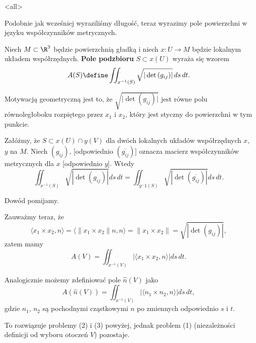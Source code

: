 \mode<all>{}
\begin{frame}

Podobnie jak wcześniej wyraziliśmy długość, teraz wyrazimy pole powierzchni w języku współczynników metrycznych.

\pause
\begin{definicja}\label{def:area-form}
Niech $M\subset \R^3$ będzie powierzchnią gładką i niech $x\colon U\to M$ będzie lokalnym układem współrzędnych. \textbf{Pole podzbioru} $S\subset x(U)$ wyraża się wzorem
\[A(S)\define\iint_{x^{-1}(S)}\sqrt{|\det{(g_{ij})}|}\,ds\,dt.\]
\end{definicja}
\pause Motywacją geometryczną jest to, że $\sqrt{|\det{(g_{ij})|}}$ jest r\'owne polu r\'ownoległoboku rozpiętego przez $x_1$ i $x_2$, kt\'ory jest styczny do powierzchni w tym punkcie.
\end{frame}
\begin{frame}[<+->]

\begin{lemat}
Załóżmy, że $S\subset x(U)\cap y(V)$ dla dwóch lokalnych układów współrzędnych $x$, $y$ na $M$. Niech $(g_{ij})$, [odpowiednio $(\overline{g_{ij}})$] oznacza macierz współczynników metrycznych dla $x$ [odpowiednio $y$]. Wtedy
\[\iint_{x^{-1}(S)}\sqrt{|\det{(g_{ij})}|}ds\,dt=\iint_{y^-1(S)}\sqrt{|\det{(\overline{g_{ij}})}|}ds\,dt.\]
\end{lemat}
Dow\'od pomijamy.
\end{frame}
\begin{frame}[<+->]

Zauważmy teraz, że \[\langle x_1\times x_2, n\rangle=\langle \|x_1\times x_2\|n,n \rangle= \|x_1\times x_2\|=\sqrt{|\det (g_{ij})|},\]\pause zatem mamy
\[A(V)=\iint_{x^{-1}(V)}|\langle x_1\times x_2, n\rangle| ds\,dt.\]

\pause Analogicznie możemy zdefiniować pole $\widehat{n}(V)$ jako 
\[A(\widehat{n}(V))=\iint_{x^{-1}(V)}|\langle n_1\times n_2, n\rangle| ds\,dt,\]
gdzie $n_1$, $n_2$ są pochodnymi cząstkowymi $n$ po zmiennych odpowiednio $s$ i $t$.

\pause To rozwiązuje problemy (2) i (3) powyżej, jednak problem (1) (niezależności definicji od wyboru otoczeń $V$) pozostaje. 

\end{frame}
